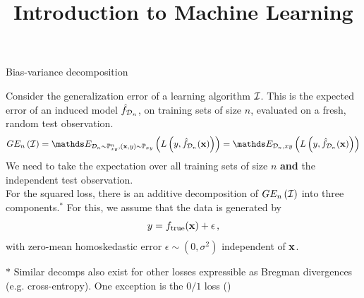 \documentclass[11pt,compress,t,notes=noshow, xcolor=table]{beamer}
\title{Introduction to Machine Learning}
\begin{document}
    

\begin{vbframe} {Bias-variance decomposition}

Consider the generalization error of a learning algorithm $\mathcal{I}$.
This is the expected error of an induced model $\hat{f}_{\mathcal{D}_n}$, on training sets of size $n$, evaluated on a fresh, random test observation.
  $$GE_n\left(\ind\right) = \E_{\D_n \sim \Pxy^n, (\xv, y) \sim \Pxy}\left( L\left(y, \fh_{\D_n}(\xv)\right) \right) = \E_{\D_n, xy}\left( L\left(y, \fh_{\D_n}(\xv)\right) \right)  $$
We need to take the expectation over all training sets of size $n$ \textbf{and} the independent test observation.\\

For the squared loss, there is an additive decomposition of $GE_n\left(\mathcal{I}\right)$ into three components.$^{\ast}$ For this, we assume that the data is generated by 
$$
y = f_{\text{true}}(\mathbf{x}) + \epsilon\,,
$$
with zero-mean homoskedastic error $\epsilon \sim (0, \sigma^2)$ independent of $\mathbf{x}$.
\vspace{0.1cm}

{\scriptsize ${\ast}$ Similar decomps also exist for other losses expressible as Bregman divergences (e.g. cross-entropy). One exception is the $0/1$ loss (\cite{BROWN2024BIAS})}

\framebreak 



\end{vbframe}
\end{document}
